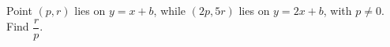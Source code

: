 Point $(p,r)$ lies on $y=x+b$, while $(2p,5r)$ lies on $y=2x+b$, with $p\ne 0$. Find $\dfrac{r}{p}$.
